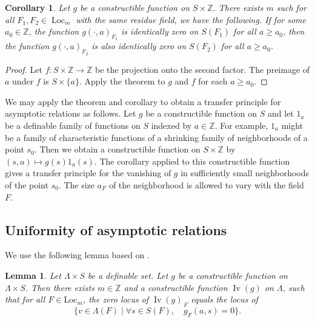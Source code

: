 \documentclass[12pt]{amsart}
\newcommand{\op}[1]{\operatorname{#1}}
\newcommand{\ring}[1]{{\mathbb #1}}
\newcommand{\locus}[1]{\op{Iv}(#1)}
\newcommand{\Loc}{\mathrm{Loc}}
\theoremstyle{plain}
\newtheorem{lem}[thm]{Lemma}
\newtheorem{cor}[thm]{Corollary}
\theoremstyle{definition}
\begin{document}
\begin{cor}\label{cor:12} Let $g$ be a constructible function on $S\times\ring{Z}$.
  There exists $m$ such for all $F_1,F_2\in\op{Loc}_m$ with the same
  residue field, we have the following.  If for some
  $a_0\in\ring{Z}$, the function $g(\cdot,a)_{F_1}$ is identically
  zero on $S(F_1)$ for all $a\ge a_0$, then the function
  $g(\cdot,a)_{F_2}$ is also identically zero on $S(F_2)$ for all
  $a\ge a_0$.
\end{cor}

\begin{proof} Let $f:S\times \ring{Z}\to\ring{Z}$ be the projection
  onto the second factor.  The preimage of $a$ under $f$ is
  $S\times\{a\}$.  Apply the theorem to $g$ and $f$ for each $a\ge
  a_0$.
\end{proof}

We may apply the theorem and corollary to obtain a transfer principle
for asymptotic relations as follows.  Let $g$ be a constructible
function on $S$ and let $1_a$ be a definable family of
functions on $S$ indexed by $a\in\ring{Z}$.  For example, $1_a$
might be a family of characteristic functions of a shrinking family of
neighborhoods of a point $s_0$.  Then we obtain a constructible
function on $S\times\ring{Z}$ by $(s,a)\mapsto g(s)1_a(s)$.
The corollary applied to this constructible function gives a transfer principle for the vanishing of $g$ in
sufficiently small neighborhoods of the point $s_0$.  The size $a_F$
of the neighborhood is allowed to vary with the field $F$.

\subsection{Uniformity of asymptotic relations}

We use the following lemma based on \cite[Th 4.4.4]{CGH}.

\begin{lem}  
  Let $\Lambda\times S$ be a definable set.  Let $g$ be a
  constructible function on $\Lambda\times S$.  Then there exists
  $m\in\ring{Z}$ and a constructible function $\locus{g}$ on $\Lambda$,
  such that for all $F\in\Loc_m$, the zero locus of $\locus{g}_{\,F}$
  equals the locus of
\[
\{v\in \Lambda(F)\mid \forall s\in S(F),\quad g_F(a,s)=0\}.
\]
\end{lem}
\end{document}

